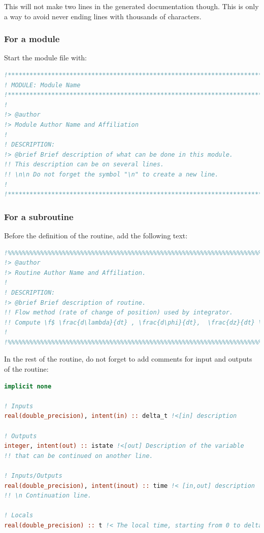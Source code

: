 \documentclass[english,a4paper,twoside]{article}
\begin{document}
\begin{remarque}
This will not make two lines in the generated documentation though. This is only a way to avoid never ending lines with thousands of characters.
\end{remarque}


\subsubsection{For a module}
Start the module file with:
\begin{lstlisting}[language=Fortran]
!******************************************************************************
! MODULE: Module Name
!******************************************************************************
!
!> @author
!> Module Author Name and Affiliation
!
! DESCRIPTION: 
!> @brief Brief description of what can be done in this module. 
!! This description can be on several lines. 
!! \n\n Do not forget the symbol "\n" to create a new line.
!
!******************************************************************************
\end{lstlisting}

\subsubsection{For a subroutine}
Before the definition of the routine, add the following text:
\begin{lstlisting}[language=Fortran]
!%%%%%%%%%%%%%%%%%%%%%%%%%%%%%%%%%%%%%%%%%%%%%%%%%%%%%%%%%%%%%%%%%%%%%%%%%%%
!> @author 
!> Routine Author Name and Affiliation.
!
! DESCRIPTION: 
!> @brief Brief description of routine. 
!! Flow method (rate of change of position) used by integrator.
!! Compute \f$ \frac{d\lambda}{dt} , \frac{d\phi}{dt},  \frac{dz}{dt} \f$ }
!
!%%%%%%%%%%%%%%%%%%%%%%%%%%%%%%%%%%%%%%%%%%%%%%%%%%%%%%%%%%%%%%%%%%%%%%%%%%% 
\end{lstlisting}

In the rest of the routine, do not forget to add comments for input and outputs of the routine: 
\begin{lstlisting}[language=Fortran]
implicit none

! Inputs
real(double_precision), intent(in) :: delta_t !<[in] description

! Outputs
integer, intent(out) :: istate !<[out] Description of the variable
!! that can be continued on another line.

! Inputs/Outputs
real(double_precision), intent(inout) :: time !< [in,out] description
!! \n Continuation line. 

! Locals
real(double_precision) :: t !< The local time, starting from 0 to delta_t
\end{lstlisting}
\end{document}
